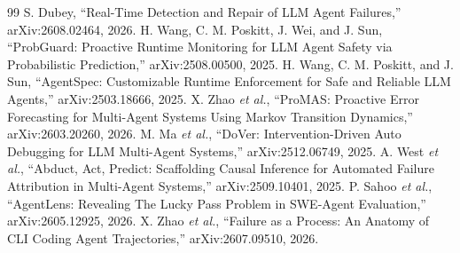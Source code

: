 \documentclass[conference]{IEEEtran}
\begin{document}
\begin{thebibliography}{99}
 S. Dubey, ``Real-Time Detection and Repair of LLM Agent Failures,'' arXiv:2608.02464, 2026.
 H. Wang, C. M. Poskitt, J. Wei, and J. Sun, ``ProbGuard: Proactive Runtime Monitoring for LLM Agent Safety via Probabilistic Prediction,'' arXiv:2508.00500, 2025.
 H. Wang, C. M. Poskitt, and J. Sun, ``AgentSpec: Customizable Runtime Enforcement for Safe and Reliable LLM Agents,'' arXiv:2503.18666, 2025.
 X. Zhao \emph{et al.}, ``ProMAS: Proactive Error Forecasting for Multi-Agent Systems Using Markov Transition Dynamics,'' arXiv:2603.20260, 2026.
 M. Ma \emph{et al.}, ``DoVer: Intervention-Driven Auto Debugging for LLM Multi-Agent Systems,'' arXiv:2512.06749, 2025.
 A. West \emph{et al.}, ``Abduct, Act, Predict: Scaffolding Causal Inference for Automated Failure Attribution in Multi-Agent Systems,'' arXiv:2509.10401, 2025.
 P. Sahoo \emph{et al.}, ``AgentLens: Revealing The Lucky Pass Problem in SWE-Agent Evaluation,'' arXiv:2605.12925, 2026.
 X. Zhao \emph{et al.}, ``Failure as a Process: An Anatomy of CLI Coding Agent Trajectories,'' arXiv:2607.09510, 2026.
\end{thebibliography}
\end{document}
